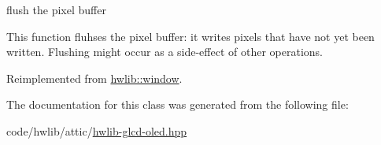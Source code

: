 flush the pixel buffer 

This function fluhses the pixel buffer\+: it writes pixels that have not yet been written. Flushing might occur as a side-\/effect of other operations. 

Reimplemented from \hyperlink{classhwlib_1_1window_a2b654a98872d174173e1df24a444c949}{hwlib\+::window}.



The documentation for this class was generated from the following file\+:\begin{DoxyCompactItemize}
\item 
code/hwlib/attic/\hyperlink{attic_2hwlib-glcd-oled_8hpp}{hwlib-\/glcd-\/oled.\+hpp}\end{DoxyCompactItemize}

